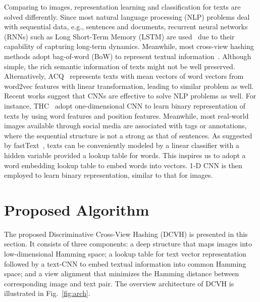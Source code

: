 \documentclass[10pt,twocolumn,letterpaper]{article}
\begin{document}
Comparing to images, representation learning and classification for texts are solved differently. Since most natural language processing (NLP) problems deal with sequential data, e.g., sentences and documents, recurrent neural networks (RNNs) such as Long Short-Term Memory (LSTM) are used~\cite{sentence_lstm} due to their capability of capturing long-term dynamics. Meanwhile, most cross-view hashing methods adopt bag-of-word (BoW) to represent textual information~\cite{seph,dcmh,cvh,THN}. Although simple, the rich semantic information of texts might not be well preserved. Alternatively, ACQ~\cite{acq} represents texts with mean vectors of word vectors from word2vec features with linear transformation, leading to similar problem as well. Recent works suggest that CNNs are effective to solve NLP problems as well. For instance, THC~\cite{text_cnn} adopt one-dimensional CNN to learn binary representation of texts by using word features and position features.  Meanwhile, most real-world images available through social media are associated with tags or annotations, where the sequential structure is not a strong as that of sentences. As suggested by fastText~\cite{joulin2016bag}, texts can be conveniently modeled by a linear classifier with a hidden variable provided a lookup table for words. This inspires us to adopt a word embedding lookup table to embed words into vectors. 1-D CNN is then employed to learn binary representation, similar to that for images.

\section{Proposed Algorithm}\label{sec:dcvh}

The proposed Discriminative Cross-View Hashing (DCVH) is presented in this section. It consists of three components: a deep structure that maps images into low-dimensional Hamming space; a lookup table for text vector representation followed by a text-CNN to embed textual information into common Hamming space; and a view alignment that minimizes the Hamming distance between corresponding image and text pair. The overview architecture of DCVH is illustrated in Fig.~\ref{fig:arch}.
\end{document}
